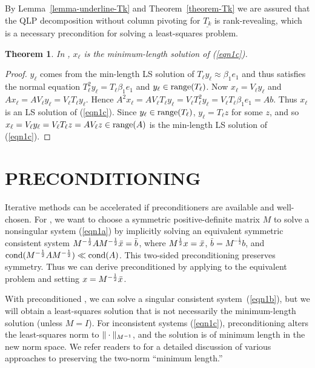 \documentclass{doc_acmtrans2m}
\newtheorem{theorem}{Theorem}[section]
\newcommand{\myhalf}{\frac12}
\begin{document}
By Lemma~\ref{lemma-underline-Tk} and Theorem~\ref{theorem-Tk} we are
assured that the QLP decomposition without column pivoting
\cite{S99,CPS11} for $\underline{T_k}$ is rank-revealing, which is a
necessary precondition for solving a least-squares problem.

\begin{theorem}   \label{theorem-MINRES-QLP}
In \MINRESQLP, $x_\ell$ is the minimum-length solution of
(\ref{eqn1c}).
\end{theorem}

\begin{proof}
$y_\ell$ comes from the min-length LS solution of $T_\ell y_\ell
  \approx \beta_1 e_1$ and thus satisfies the normal equation $T_\ell
  ^2 y_\ell = T_\ell \beta_1 e_1$ and $y_\ell \in \range(T_\ell)$.
  Now $x_\ell = V_\ell y_\ell$ and $A x_\ell = A V_\ell y_\ell =
  V_\ell T_\ell y_\ell$.  Hence $A^2 x_\ell = A V_\ell T_\ell y_\ell =
  V_\ell T_\ell ^2 y_\ell = V_\ell T_\ell \beta_1 e_1 = A b$. Thus
  $x_\ell$ is an LS solution of (\ref{eqn1c}).  Since $y_\ell \in
  \range(T_\ell)$, $y_\ell = T_\ell z$ for some $z$, and so $x_\ell =
  V_\ell y_\ell = V_\ell T_\ell z = A V_\ell z \in \range(A)$ is the
  min-length LS solution of (\ref{eqn1c}).
\end{proof}


\section{PRECONDITIONING} \label{sect-precond}

Iterative methods can be accelerated if preconditioners are available
and well-chosen. For \MINRESQLP, we want to choose a symmetric
positive-definite matrix $M$ to solve a nonsingular system
(\ref{eqn1a}) by implicitly solving an equivalent symmetric consistent
system $M^{-\myhalf}A M^{-\myhalf}\xbar=\bar{b}$, where $M^{\myhalf}
x=\xbar$, $\bar{b} = M^{-\myhalf}b$, and $\cond{(M^{-\myhalf}A
  M^{-\myhalf})} \ll \cond{(A)}$.  This two-sided preconditioning
preserves symmetry.  Thus we can derive preconditioned \MINRESQLP by
applying \MINRESQLP to the equivalent problem and setting
$x=M^{-\myhalf}\xbar$.

With preconditioned \MINRESQLP, we can solve a singular consistent
system~(\ref{eqn1b}), but we will obtain a least-squares solution that
is not necessarily the minimum-length solution (unless $M=I$).  For
inconsistent systems (\ref{eqn1c}), preconditioning alters the
least-squares norm to $\norm{\cdot}_{M^{-1}}$, and the solution is of
minimum length in the new norm space. We refer readers to
\cite[Section 7]{CPS11} for a detailed discussion of various
approaches to preserving the two-norm ``minimum length.''
\end{document}

